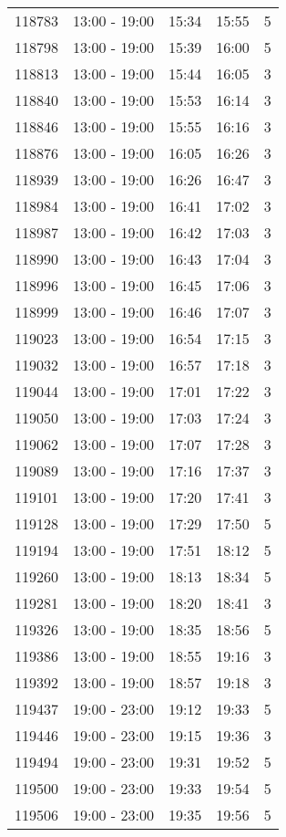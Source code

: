 \documentclass{article}
\begin{document}
\begin{tabular}{llccc}
118783 & 13:00 - 19:00 & 15:34 & 15:55 & 5 \\
118798 & 13:00 - 19:00 & 15:39 & 16:00 & 5 \\
118813 & 13:00 - 19:00 & 15:44 & 16:05 & 3 \\
118840 & 13:00 - 19:00 & 15:53 & 16:14 & 3 \\
118846 & 13:00 - 19:00 & 15:55 & 16:16 & 3 \\
118876 & 13:00 - 19:00 & 16:05 & 16:26 & 3 \\
118939 & 13:00 - 19:00 & 16:26 & 16:47 & 3 \\
118984 & 13:00 - 19:00 & 16:41 & 17:02 & 3 \\
118987 & 13:00 - 19:00 & 16:42 & 17:03 & 3 \\
118990 & 13:00 - 19:00 & 16:43 & 17:04 & 3 \\
118996 & 13:00 - 19:00 & 16:45 & 17:06 & 3 \\
118999 & 13:00 - 19:00 & 16:46 & 17:07 & 3 \\
119023 & 13:00 - 19:00 & 16:54 & 17:15 & 3 \\
119032 & 13:00 - 19:00 & 16:57 & 17:18 & 3 \\
119044 & 13:00 - 19:00 & 17:01 & 17:22 & 3 \\
119050 & 13:00 - 19:00 & 17:03 & 17:24 & 3 \\
119062 & 13:00 - 19:00 & 17:07 & 17:28 & 3 \\
119089 & 13:00 - 19:00 & 17:16 & 17:37 & 3 \\
119101 & 13:00 - 19:00 & 17:20 & 17:41 & 3 \\
119128 & 13:00 - 19:00 & 17:29 & 17:50 & 5 \\
119194 & 13:00 - 19:00 & 17:51 & 18:12 & 5 \\
119260 & 13:00 - 19:00 & 18:13 & 18:34 & 5 \\
119281 & 13:00 - 19:00 & 18:20 & 18:41 & 3 \\
119326 & 13:00 - 19:00 & 18:35 & 18:56 & 5 \\
119386 & 13:00 - 19:00 & 18:55 & 19:16 & 3 \\
119392 & 13:00 - 19:00 & 18:57 & 19:18 & 3 \\
119437 & 19:00 - 23:00 & 19:12 & 19:33 & 5 \\
119446 & 19:00 - 23:00 & 19:15 & 19:36 & 3 \\
119494 & 19:00 - 23:00 & 19:31 & 19:52 & 5 \\
119500 & 19:00 - 23:00 & 19:33 & 19:54 & 5 \\
119506 & 19:00 - 23:00 & 19:35 & 19:56 & 5 \\

\end{tabular}
\end{document}
